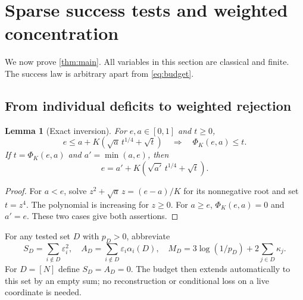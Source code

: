 \documentclass[11pt,reqno]{amsart}
\numberwithin{equation}{section}
\newtheorem{lemma}[theorem]{Lemma}
\theoremstyle{definition}
\theoremstyle{remark}
\newcommand{\eps}{\varepsilon}
\newcommand{\PhiK}{\Phi_K}
\begin{document}

\clearpage

\section{Sparse success tests and weighted concentration}\label{sec:proof}
We now prove \cref{thm:main}. All variables in this section are classical and finite. The success law is arbitrary apart from \eqref{eq:budget}.

\subsection{From individual deficits to weighted rejection}
\begin{lemma}[Exact inversion]\label{lem:inverse}
For \(e,a\in[0,1]\) and \(t\ge0\),
\[
 e\le a+K(\sqrt a\,t^{1/4}+\sqrt t)
 \quad\Longrightarrow\quad \PhiK(e,a)\le t.
 \]
If \(t=\PhiK(e,a)\) and \(a'=\min(a,e)\), then
\[
 e=a'+K(\sqrt{a'}\,t^{1/4}+\sqrt t).
\]
\end{lemma}
\begin{proof}
For \(a<e\), solve \(z^2+\sqrt a\,z=(e-a)/K\) for its nonnegative root and set \(t=z^4\). The polynomial is increasing for \(z\ge0\). For \(a\ge e\), \(\PhiK(e,a)=0\) and \(a'=e\). These two cases give both assertions.
\end{proof}

For any tested set \(D\) with \(p_D>0\), abbreviate
\[
 S_D=\sum_{i\notin D}\eps_i^2,\quad
 A_D=\sum_{i\notin D}\eps_i\alpha_i(D),\quad
 M_D=3\log(1/p_D)+2\sum_{j\in D}\kappa_j.
\]
For \(D=[N]\) define \(S_D=A_D=0\). The budget then extends automatically to this set by an empty sum; no reconstruction or conditional loss on a live coordinate is needed.
\end{document}
